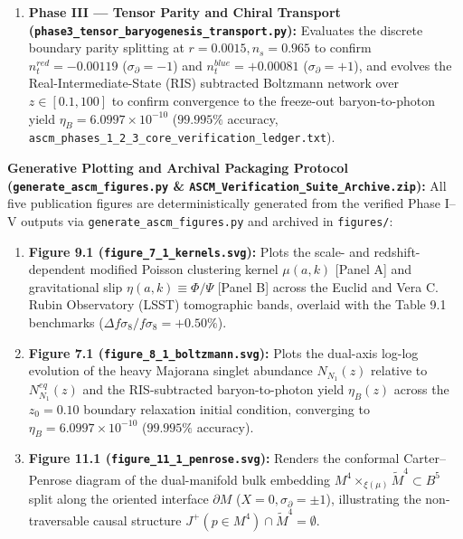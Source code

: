\documentclass[aps,prd,onecolumn,superscriptaddress,nofootinbib,longbibliography,10pt]{revtex4-2}
\begin{document}
{{\begin{enumerate}
\item \textbf{Phase III — Tensor Parity and Chiral Transport (\texttt{phase3_tensor_baryogenesis_transport.py}):} Evaluates the discrete boundary parity splitting at \(r = 0.0015, n_s = 0.965\) to confirm \(n_t^{red} = -0.00119\) (\(\sigma_{\partial} = -1\)) and \(n_t^{blue} = +0.00081\) (\(\sigma_{\partial} = +1\)), and evolves the Real-Intermediate-State (RIS) subtracted Boltzmann network over \(z \in [0.1, 100]\) to confirm convergence to the freeze-out baryon-to-photon yield \(\eta_B = 6.0997 \times 10^{-10}\) (\(99.995\%\) accuracy, \texttt{ascm_phases_1_2_3_core_verification_ledger.txt}).

\end{enumerate}



\textbf{Generative Plotting and Archival Packaging Protocol (\texttt{generate_ascm_figures.py} \& \texttt{ASCM_Verification_Suite_Archive.zip}):} All five publication figures are deterministically generated from the verified Phase I–V outputs via \texttt{generate_ascm_figures.py} and archived in \texttt{figures/}:



\begin{enumerate}
  
\item \textbf{Figure 9.1 (\texttt{figure_7_1_kernels.svg}):} Plots the scale- and redshift-dependent modified Poisson clustering kernel \(\mu(a,k)\) [Panel A] and gravitational slip \(\eta(a,k) \equiv \Phi/\Psi\) [Panel B] across the Euclid and Vera C. Rubin Observatory (LSST) tomographic bands, overlaid with the Table 9.1 benchmarks (\(\Delta f\sigma_8/f\sigma_8 = +0.50\%\)).
  
\item \textbf{Figure 7.1 (\texttt{figure_8_1_boltzmann.svg}):} Plots the dual-axis log-log evolution of the heavy Majorana singlet abundance \(N_{N_1}(z)\) relative to \(N_{N_1}^{eq}(z)\) and the RIS-subtracted baryon-to-photon yield \(\eta_B(z)\) across the \(z_0 = 0.10\) boundary relaxation initial condition, converging to \(\eta_B = 6.0997 \times 10^{-10}\) (\(99.995\%\) accuracy).
  
\item \textbf{Figure 11.1 (\texttt{figure_11_1_penrose.svg}):} Renders the conformal Carter–Penrose diagram of the dual-manifold bulk embedding \(M^4 \times_{\xi(\mu)} \tilde{M}^4 \subset B^5\) split along the oriented interface \(\partial M\) (\(X = 0, \sigma_{\partial} = \pm 1\)), illustrating the non-traversable causal structure \(J^+(p \in M^4) \cap \tilde{M}^4 = \emptyset\).
  

\end{enumerate}}}
\end{document}
